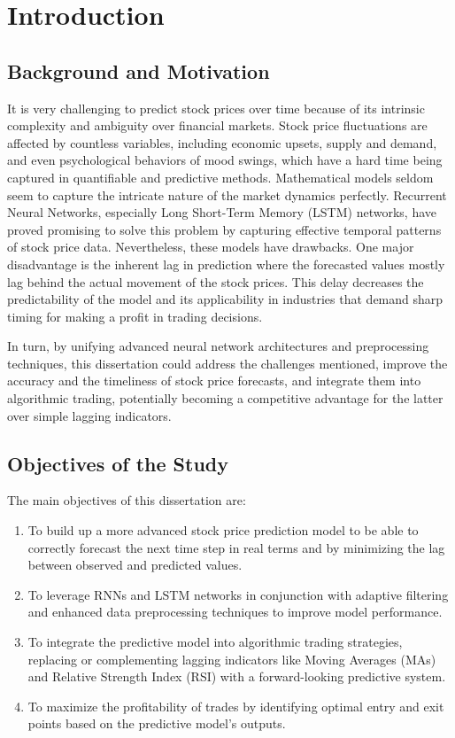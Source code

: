 \chapter{Introduction}

\section{Background and Motivation}
It is very challenging to predict stock prices over time because of its intrinsic complexity and ambiguity over financial markets. Stock price fluctuations are affected by countless variables, including economic upsets, supply and demand, and even psychological behaviors of mood swings, which have a hard time being captured in quantifiable and predictive methods. Mathematical models seldom seem to capture the intricate nature of the market dynamics perfectly. Recurrent Neural Networks, especially Long Short-Term Memory (LSTM) networks, have proved promising to solve this problem by capturing effective temporal patterns of stock price data. Nevertheless, these models have drawbacks. One major disadvantage is the inherent lag in prediction where the forecasted values mostly lag behind the actual movement of the stock prices. This delay decreases the predictability of the model and its applicability in industries that demand sharp timing for making a profit in trading decisions.

In turn, by unifying advanced neural network architectures and preprocessing techniques, this dissertation could address the challenges mentioned, improve the accuracy and the timeliness of stock price forecasts, and integrate them into algorithmic trading, potentially becoming a competitive advantage for the latter over simple lagging indicators.

\section{Objectives of the Study}
The main objectives of this dissertation are:
\begin{enumerate}
    \item To build up a more advanced stock price prediction model to be able to correctly forecast the next time step in real terms and by minimizing the lag between
observed and predicted values.
    \item To leverage RNNs and LSTM networks in conjunction with adaptive filtering and enhanced data preprocessing techniques to improve model performance.
    \item To integrate the predictive model into algorithmic trading strategies, replacing or complementing lagging indicators like Moving Averages (MAs) and Relative Strength Index (RSI) with a forward-looking predictive system.
    \item To maximize the profitability of trades by identifying optimal entry and exit points based on the predictive model’s outputs.
\end{enumerate}


